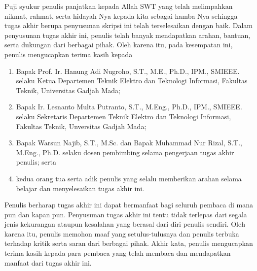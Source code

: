 Puji syukur penulis panjatkan kepada Allah SWT yang telah melimpahkan nikmat, rahmat, serta hidayah-Nya kepada kita sebagai hamba-Nya sehingga tugas akhir berupa penyusunan skripsi ini telah terselesaikan dengan baik. Dalam penyusunan tugas akhir ini, penulis telah banyak mendapatkan arahan, bantuan, serta dukungan dari berbagai pihak. Oleh karena itu, pada kesempatan ini, penulis mengucapkan terima kasih kepada

\begin{enumerate}
	\item Bapak Prof. Ir. Hanung Adi Nugroho, S.T., M.E., Ph.D., IPM., SMIEEE. selaku Ketua Departemen Teknik Elektro dan Teknologi Informasi, Fakultas Teknik, Universitas Gadjah Mada;
 
	\item Bapak Ir. Lesnanto Multa Putranto, S.T., M.Eng., Ph.D., IPM., SMIEEE. selaku Sekretaris Departemen Teknik Elektro dan Teknologi Informasi, Fakultas Teknik, Unversitas Gadjah Mada;
 
        \item Bapak Warsun Najib, S.T., M.Sc. dan Bapak Muhammad Nur Rizal, S.T., M.Eng., Ph.D. selaku dosen pembimbing selama pengerjaan tugas akhir penulis; serta
	
	\item kedua orang tua serta adik penulis yang selalu memberikan arahan selama belajar dan menyelesaikan tugas akhir ini.
\end{enumerate}

Penulis berharap tugas akhir ini dapat bermanfaat bagi seluruh pembaca di mana pun dan kapan pun. Penyusunan tugas akhir ini tentu tidak terlepas dari segala jenis kekurangan ataupun kesalahan yang berasal dari diri penulis sendiri. Oleh karena itu, penulis memohon maaf yang setulus-tulusnya dan penulis terbuka terhadap kritik serta saran dari berbagai pihak. Akhir kata, penulis mengucapkan terima kasih kepada para pembaca yang telah membaca dan mendapatkan manfaat dari tugas akhir ini.

